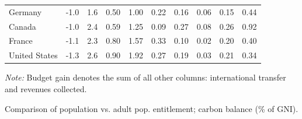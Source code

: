 \documentclass[12pt,english]{article}
\begin{document}
\begin{bibunit}
\begin{table}[!h]
{\begin{tabular}[t]{lccccccccc}
Germany & -1.0 & 1.6 & 0.50 & 1.00 & 0.22 & 0.16 & 0.06 & 0.15 & 0.44\\
Canada & -1.0 & 2.4 & 0.59 & 1.25 & 0.09 & 0.27 & 0.08 & 0.26 & 0.92\\
France & -1.1 & 2.3 & 0.80 & 1.57 & 0.33 & 0.10 & 0.02 & 0.20 & 0.40\\
United States & -1.3 & 2.6 & 0.90 & 1.92 & 0.27 & 0.19 & 0.03 & 0.21 & 0.34\\
\bottomrule
\end{tabular}
} 
{\footnotesize \textit{Note:}  Budget gain denotes the sum of all other columns: international transfer and revenues collected. %
}
\end{table}

\begin{table}[!h]
  \vspace{-1cm}
  \caption{\label{tab:transfers_balance}Comparison of population vs. adult pop. entitlement; carbon balance (\% of GNI). }
  \makebox[\textwidth][c]{
  
}
\end{table}
\end{bibunit}
\end{document}
